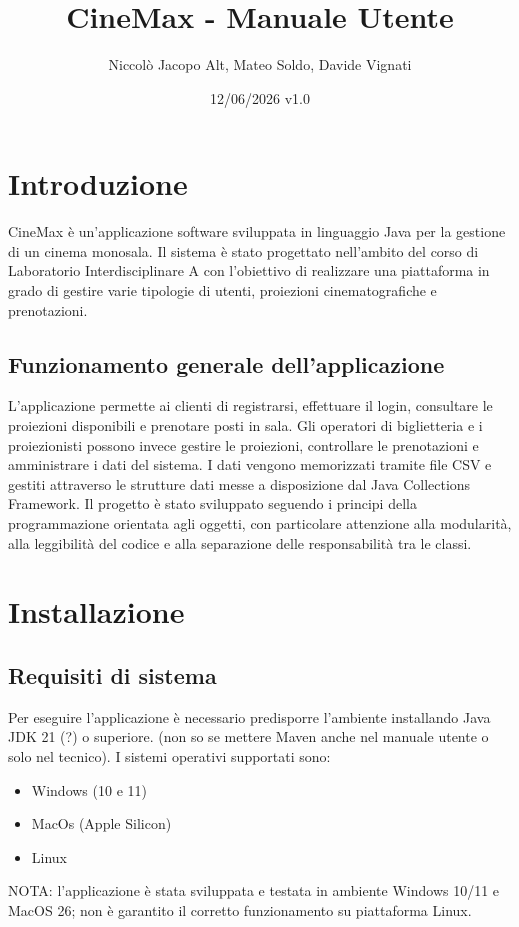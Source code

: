 \documentclass{article}
\title{\textbf{CineMax - Manuale Utente}}
\author{Niccolò Jacopo Alt, Mateo Soldo, Davide Vignati}
\date{12/06/2026 v1.0}
\begin{document}
\newpage

\maketitle
\newpage
\tableofcontents
\newpage

\section{Introduzione}
CineMax è un’applicazione software sviluppata in linguaggio Java per la gestione di un cinema monosala.  Il sistema è stato progettato nell’ambito del corso di Laboratorio Interdisciplinare A con l’obiettivo di realizzare una piattaforma in grado di gestire varie tipologie di utenti, proiezioni cinematografiche e prenotazioni.
\subsection{Funzionamento generale dell'applicazione}
L’applicazione permette ai clienti di registrarsi, effettuare il login, consultare le proiezioni disponibili e prenotare posti in sala.  
Gli operatori di biglietteria e i proiezionisti possono invece gestire le proiezioni, controllare le prenotazioni e amministrare i dati del sistema.
I dati vengono memorizzati tramite file CSV e gestiti attraverso le strutture dati messe a disposizione dal Java Collections Framework.  
Il progetto è stato sviluppato seguendo i principi della programmazione orientata agli oggetti, con particolare attenzione alla modularità, alla leggibilità del codice e alla separazione delle responsabilità tra le classi.

\section{Installazione}
\subsection{Requisiti di sistema}
Per eseguire l’applicazione è necessario predisporre l’ambiente installando Java JDK 21 (?) o superiore. (non so se mettere Maven anche nel manuale utente o solo nel tecnico).
I sistemi operativi supportati sono:
\begin{itemize}
    \item Windows (10 e 11)
    \item MacOs (Apple Silicon)
    \item Linux
\end{itemize}
NOTA: l’applicazione è stata sviluppata e testata in ambiente Windows 10/11 e MacOS 26; non è garantito il corretto funzionamento su piattaforma Linux. 
\end{document}
